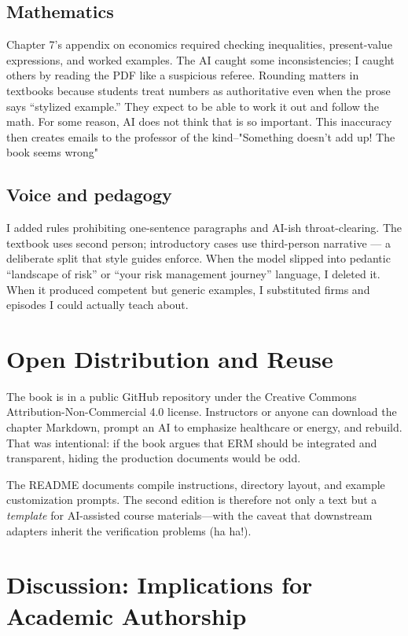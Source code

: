 \documentclass[11pt,letterpaper]{article}
\begin{document}
\subsection{Mathematics}

Chapter 7's appendix on economics required checking inequalities, present-value expressions, and worked examples. The AI caught some inconsistencies; I caught others by reading the PDF like a suspicious referee. Rounding matters in textbooks because students treat numbers as authoritative even when the prose says ``stylized example.'' They expect to be able to work it out and follow the math. For some reason, AI does not think that is so important. This inaccuracy then creates emails to the professor of the kind--"Something doesn't add up! The book seems wrong"

\subsection{Voice and pedagogy}

I added rules prohibiting one-sentence paragraphs and AI-ish throat-clearing. The textbook uses second person; introductory cases use third-person narrative — a deliberate split that style guides enforce. When the model slipped into pedantic ``landscape of risk'' or ``your risk management journey'' language, I deleted it. When it produced competent but generic examples, I substituted firms and episodes I could actually teach about.

\section{Open Distribution and Reuse}

The book is in a public GitHub repository under the Creative Commons Attribution-Non-Commercial 4.0 license. Instructors or anyone can download the chapter Markdown, prompt an AI to emphasize healthcare or energy, and rebuild. That was intentional: if the book argues that ERM should be integrated and transparent, hiding the production documents would be odd.

The README documents compile instructions, directory layout, and example customization prompts. The second edition is therefore not only a text but a \emph{template} for AI-assisted course materials---with the caveat that downstream adapters inherit the verification problems (ha ha!).

\section{Discussion: Implications for Academic Authorship}
\end{document}
